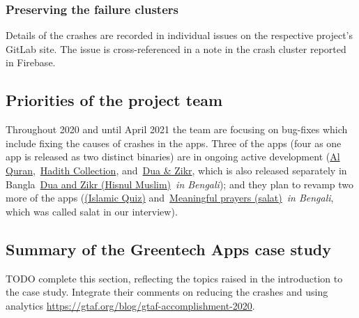 \subsubsection{Preserving the failure clusters}
Details of the crashes are recorded in individual issues on the respective project's GitLab site. The issue is cross-referenced in a note in the crash cluster reported in Firebase.

\subsection{Priorities of the project team}
Throughout 2020 and until April 2021 the team are focusing on bug-fixes which include fixing the causes of crashes in the apps. Three of the apps (four as one app is released as two distinct binaries) are in ongoing active development (\href{https://play.google.com/store/apps/details?id=com.greentech.quran}{Al Quran},~\href{https://play.google.com/store/apps/details?id=com.greentech.hadith}{Hadith Collection}, and~\href{https://play.google.com/store/apps/details?id=com.greentech.hisnulmuslim}{Dua \& Zikr}, which is also released separately in Bangla~\href{https://play.google.com/store/apps/details?id=com.greentech.hisnulmuslimbn}{{Dua and Zikr (Hisnul Muslim)}}~\emph{in Bengali}); and they plan to revamp two more of the apps (\href{https://play.google.com/store/apps/details?id=com.greentech.islamicquiz}{(Islamic Quiz)} and~\href{https://play.google.com/store/apps/details?id=com.greentech.salatbn}{Meaningful prayers (salat)}~\textit{in Bengali}, which was called salat in our interview).



\subsection{Summary of the Greentech Apps case study}
TODO complete this section, reflecting the topics raised in the introduction to the case study.
Integrate their comments on reducing the crashes and using analytics \url{https://gtaf.org/blog/gtaf-accomplishment-2020}.